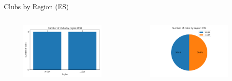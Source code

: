 \documentclass[aspectratio=169, xcolor=dvipsnames]{beamer}
\begin{document}
\begin{frame}{Clubs by Region (ES)}
\begin{columns}[c]
\begin{column}{.45\textwidth}
\begin{figure}
    \centering
    \includegraphics[width=\textwidth]{img/clubsbyregion-es.png}
\end{figure}
\end{column}

\begin{column}{.55\textwidth}
\begin{figure}
    \centering
    \includegraphics[width=\textwidth]{img/clubsbyregion-es-pie.png}
\end{figure}
\end{column}
\end{columns}

\end{frame}
\end{document}
